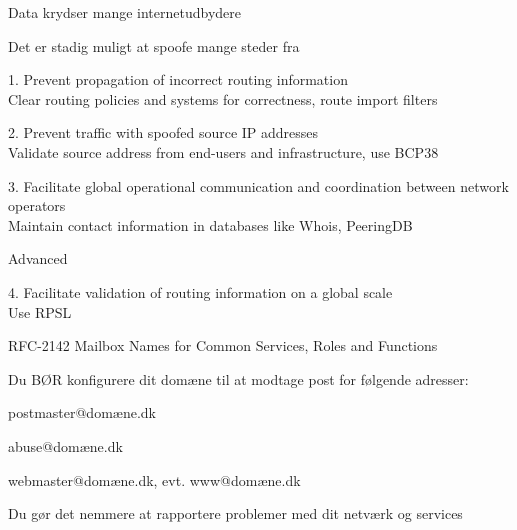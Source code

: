 \documentclass[Screen16to9,17pt]{foils}
\begin{document}


\begin{list2}
\item Data krydser mange internetudbydere
\item Det er stadig muligt at spoofe mange steder fra
\end{list2}


\begin{list1}
\item 1. Prevent propagation of incorrect routing information\\
Clear routing policies and systems for correctness, route import filters
\item 2. Prevent traffic with spoofed source IP addresses\\
Validate source address from end-users and infrastructure, use BCP38
\item 3. Facilitate global operational communication and coordination between network operators\\
Maintain contact information in databases like Whois, PeeringDB
{\small{}}

\item Advanced
\item 4. Facilitate validation of routing information on a global scale\\
Use RPSL {\small{}}
\end{list1}


\begin{list1}
\item RFC-2142 Mailbox Names for Common Services, Roles and Functions
\item Du BØR konfigurere dit domæne til at modtage post for følgende adresser:
\begin{list2}
\item postmaster@domæne.dk
\item abuse@domæne.dk
\item webmaster@domæne.dk, evt. www@domæne.dk
\end{list2}
\item Du gør det nemmere at rapportere problemer med dit netværk og services
\end{list1}
\end{document}
